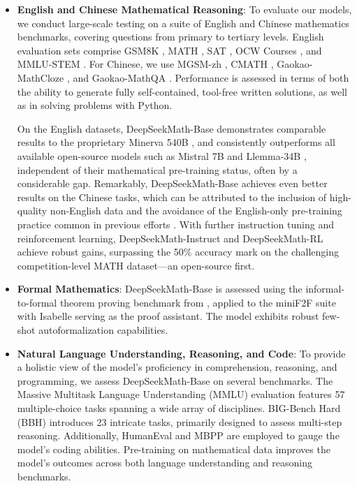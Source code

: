 \begin{itemize}[topsep=0pt]
    \item \textbf{English and Chinese Mathematical Reasoning}: To evaluate our models, we conduct large-scale testing on a suite of English and Chinese mathematics benchmarks, covering questions from primary to tertiary levels. English evaluation sets comprise GSM8K \citep{gsm8k}, MATH \citep{MATH}, SAT \citep{llemma}, OCW Courses \citep{minerva}, and MMLU-STEM \citep{mmlu}. For Chinese, we use MGSM-zh \citep{mgsm}, CMATH \citep{wei2023cmath}, Gaokao-MathCloze \citep{agieval}, and Gaokao-MathQA \citep{agieval}. Performance is assessed in terms of both the ability to generate fully self-contained, tool-free written solutions, as well as in solving problems with Python.

    On the English datasets, DeepSeekMath-Base demonstrates comparable results to the proprietary Minerva 540B \citep{minerva}, and consistently outperforms all available open-source models such as Mistral 7B \citep{mistral} and Llemma-34B \citep{llemma}, independent of their mathematical pre-training status, often by a considerable gap. Remarkably, DeepSeekMath-Base achieves even better results on the Chinese tasks, which can be attributed to the inclusion of high-quality non-English data and the avoidance of the English-only pre-training practice common in previous efforts \citep{minerva,llemma}. With further instruction tuning and reinforcement learning, DeepSeekMath-Instruct and DeepSeekMath-RL achieve robust gains, surpassing the 50\% accuracy mark on the challenging competition-level MATH dataset—an open-source first.

\item \textbf{Formal Mathematics}: DeepSeekMath-Base is assessed using the informal-to-formal theorem proving benchmark from \citep{dsp_proof}, applied to the miniF2F suite \citep{minif2f} with Isabelle \citep{isabelle} serving as the proof assistant. The model exhibits robust few-shot autoformalization capabilities.
\item \textbf{Natural Language Understanding, Reasoning, and Code}: To provide a holistic view of the model’s proficiency in comprehension, reasoning, and programming, we assess DeepSeekMath-Base on several benchmarks. The Massive Multitask Language Understanding (MMLU) evaluation \citep{mmlu} features 57 multiple-choice tasks spanning a wide array of disciplines. BIG-Bench Hard (BBH) \citep{bbh} introduces 23 intricate tasks, primarily designed to assess multi-step reasoning. Additionally, HumanEval \citep{codex} and MBPP \citep{mbpp} are employed to gauge the model's coding abilities. Pre-training on mathematical data improves the model’s outcomes across both language understanding and reasoning benchmarks.


\end{itemize}
